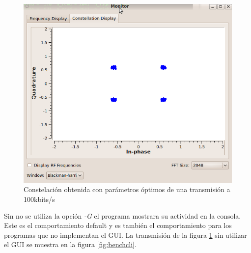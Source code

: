 \begin{figure}[htp]
  \centering
  \includegraphics[width=5.5in]{figs/firstgoodconst}
  \vspace{0.3in}
  \caption{Constelaci\'on obtenida con par\'ametros \'optimos de una transmisi\'on a 100kbits/s}
  \label{fig:firstgoodconst}
\end{figure}

Sin no se utiliza la opci\'on \emph{-G} el programa mostrara su actividad en la consola. Este es el
comportamiento default y es tambi\'en el comportamiento para los programas que no implementan el
GUI. La transmisi\'on de la figura \ref{fig:firstgoodconst} sin utilizar el GUI se muestra en la
figura \ref{fig:benchcli}.

